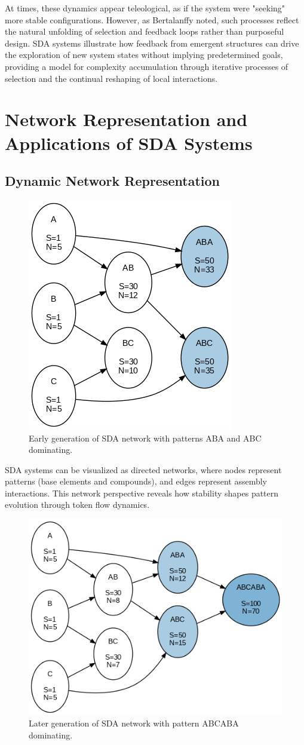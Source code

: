 \documentclass[preprint,12pt]{elsarticle}
\begin{document}
At times, these dynamics appear teleological, as if the system were "seeking" more stable configurations. However, as Bertalanffy \cite{bertalanffy1968general} noted, such processes reflect the natural unfolding of selection and feedback loops rather than purposeful design. SDA systems illustrate how feedback from emergent structures can drive the exploration of new system states without implying predetermined goals, providing a model for complexity accumulation through iterative processes of selection and the continual reshaping of local interactions.

\section{Network Representation and Applications of SDA Systems}

\subsection{Dynamic Network Representation}

\begin{figure}[H]
    \centering
    \includegraphics[width=0.4\linewidth]{figure_11.png}
    \caption{Early generation of SDA network with patterns ABA and ABC dominating.}
    \label{fig:figure_11}
\end{figure}

SDA systems can be visualized as directed networks, where nodes represent patterns (base elements and compounds), and edges represent assembly interactions. This network perspective reveals how stability shapes pattern evolution through token flow dynamics.

\begin{figure}[h]
    \centering
    \includegraphics[width=0.5\linewidth]{figure_12.png}
    \caption{Later generation of SDA network with pattern ABCABA dominating.}
    \label{fig:figure_12}
\end{figure}
\end{document}
